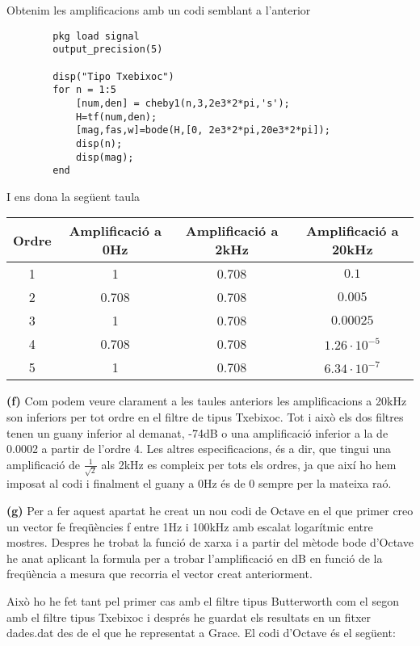 \documentclass[12pt, a4papre]{article}
\begin{document}
	Obtenim les amplificacions amb un codi semblant a l'anterior
	\begin{lstlisting}
		pkg load signal
		output_precision(5)

		disp("Tipo Txebixoc")
		for n = 1:5
  			[num,den] = cheby1(n,3,2e3*2*pi,'s');
  			H=tf(num,den);
  			[mag,fas,w]=bode(H,[0, 2e3*2*pi,20e3*2*pi]);
  			disp(n);
  			disp(mag);
		end
	\end{lstlisting}
	
	I ens dona la següent taula
	
	\begin{center}
		\begin{tabular}{ |c | c  c  c|}
			\hline
			Ordre & Amplificació a 0Hz	& Amplificació a 2kHz 	& Amplificació a 20kHz \\ \hline
			1 &1 		 				& 0.708  				& $0.1	$		\\ 
			2 &0.708 					& 0.708				& $0.005	$		\\
			3 &1 						& 0.708				& $0.00025$		\\
			4 &0.708					& 0.708				& $1.26\cdot10^{-5}$	\\
			5 &1 						& 0.708				& $6.34\cdot10^{-7}$\\
			\hline
		\end{tabular}
	\end{center}

	\textbf{(f)} Com podem veure clarament a les taules anteriors les amplificacions a 20kHz son inferiors per tot ordre en el filtre de tipus Txebixoc.
	Tot i això els dos filtres tenen un guany inferior al demanat, -74dB o una amplificació inferior a la de 0.0002 a partir de l'ordre 4. Les altres especificacions, 
	és a dir, que tingui una amplificació de $\frac{1}{\sqrt{2}}$ als 2kHz es compleix per tots els ordres, ja que així ho hem imposat al codi 
	i finalment el guany a 0Hz és de 0 sempre per la mateixa raó.
	
	\textbf{(g)} Per a fer aquest apartat he creat un nou codi de Octave en el que primer creo un vector fe freqüències f entre 1Hz i 100kHz amb escalat logarítmic entre mostres.
	Despres he trobat la funció de xarxa i a partir del mètode bode d'Octave he anat aplicant la formula per a trobar l'amplificació en dB en funció de la freqüència a mesura que
	recorria el vector creat anteriorment.
	
	Això ho he fet tant pel primer cas amb el filtre tipus Butterworth com el segon amb el filtre tipus Txebixoc i després he guardat els resultats en un fitxer dades.dat des de el que he
	representat a Grace. El codi d'Octave és el següent:
	
\end{document}
